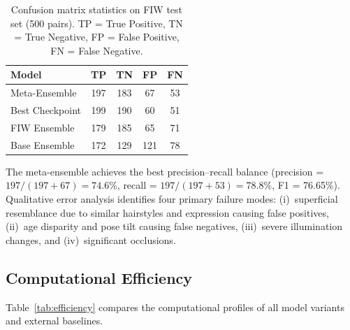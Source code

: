 \documentclass[journal,12pt]{IEEEtran}
\begin{document}
\begin{table}[t]
    \centering
    \caption{Confusion matrix statistics on FIW test set (500 pairs).
    TP = True Positive, TN = True Negative, FP = False Positive,
    FN = False Negative.}
    \label{tab:confusion}
    \begin{tabular}{lcccc}
        \toprule
        \textbf{Model} & \textbf{TP} & \textbf{TN} & \textbf{FP} & \textbf{FN} \\
        \midrule
        Meta-Ensemble   & 197 & 183 & 67 & 53 \\
        Best Checkpoint & 199 & 190 & 60 & 51 \\
        FIW Ensemble    & 179 & 185 & 65 & 71 \\
        Base Ensemble   & 172 & 129 & 121 & 78 \\
        \bottomrule
    \end{tabular}
\end{table}

The meta-ensemble achieves the best precision--recall balance (precision =
$197/(197+67) = 74.6\%$, recall = $197/(197+53) = 78.8\%$, F1 = 76.65\%).
Qualitative error analysis identifies four primary failure modes:
(i)~superficial resemblance due to similar hairstyles and expression
causing false positives, (ii)~age disparity and pose tilt causing false
negatives, (iii)~severe illumination changes, and (iv)~significant
occlusions.

\subsection{Computational Efficiency}
\label{sec:efficiency}

Table~\ref{tab:efficiency} compares the computational profiles of all
model variants and external baselines.
\end{document}
